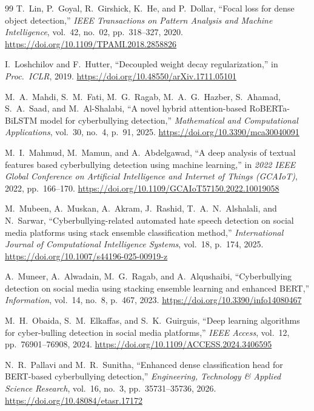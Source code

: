 \documentclass[10pt,twocolumn,a4paper]{article}
\begin{document}
\begin{thebibliography}{99}
T.~Lin, P.~Goyal, R.~Girshick, K.~He, and P.~Dollar, ``Focal loss for dense object detection,'' \textit{IEEE Transactions on Pattern Analysis and Machine Intelligence}, vol.~42, no.~02, pp.~318--327, 2020. \url{https://doi.org/10.1109/TPAMI.2018.2858826}

I.~Loshchilov and F.~Hutter, ``Decoupled weight decay regularization,'' in \textit{Proc.\ ICLR}, 2019. \url{https://doi.org/10.48550/arXiv.1711.05101}

M.~A.~Mahdi, S.~M.~Fati, M.~G.~Ragab, M.~A.~G.~Hazber, S.~Ahamad, S.~A.~Saad, and M.~Al-Shalabi, ``A novel hybrid attention-based RoBERTa-BiLSTM model for cyberbullying detection,'' \textit{Mathematical and Computational Applications}, vol.~30, no.~4, p.~91, 2025. \url{https://doi.org/10.3390/mca30040091}

M.~I.~Mahmud, M.~Mamun, and A.~Abdelgawad, ``A deep analysis of textual features based cyberbullying detection using machine learning,'' in \textit{2022 IEEE Global Conference on Artificial Intelligence and Internet of Things (GCAIoT)}, 2022, pp.~166--170. \url{https://doi.org/10.1109/GCAIoT57150.2022.10019058}

M.~Mubeen, A.~Muskan, A.~Akram, J.~Rashid, T.~A.~N.~Alshalali, and N.~Sarwar, ``Cyberbullying-related automated hate speech detection on social media platforms using stack ensemble classification method,'' \textit{International Journal of Computational Intelligence Systems}, vol.~18, p.~174, 2025. \url{https://doi.org/10.1007/s44196-025-00919-z}

A.~Muneer, A.~Alwadain, M.~G.~Ragab, and A.~Alqushaibi, ``Cyberbullying detection on social media using stacking ensemble learning and enhanced BERT,'' \textit{Information}, vol.~14, no.~8, p.~467, 2023. \url{https://doi.org/10.3390/info14080467}

M.~H.~Obaida, S.~M.~Elkaffas, and S.~K.~Guirguis, ``Deep learning algorithms for cyber-bulling detection in social media platforms,'' \textit{IEEE Access}, vol.~12, pp.~76901--76908, 2024. \url{https://doi.org/10.1109/ACCESS.2024.3406595}

N.~R.~Pallavi and M.~R.~Sunitha, ``Enhanced dense classification head for BERT-based cyberbullying detection,'' \textit{Engineering, Technology \& Applied Science Research}, vol.~16, no.~3, pp.~35731--35736, 2026. \url{https://doi.org/10.48084/etasr.17172}


\end{thebibliography}
\end{document}
